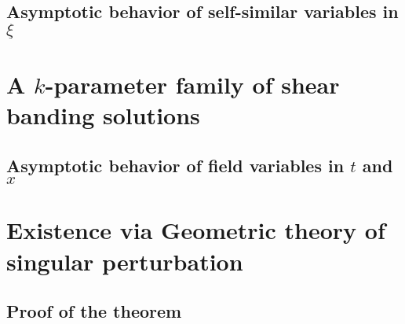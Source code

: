 \documentclass[a4paper,11pt]{article}
\begin{document}

\subsection{Asymptotic behavior of self-similar variables in $\xi$}
\section{A $k$-parameter family of shear banding solutions}
\subsection{Asymptotic behavior of field variables in $t$ and $x$}
\section{Existence via Geometric theory of singular perturbation}
\subsection{Proof of the theorem} \label{sec:proof_proof}
\end{document}

